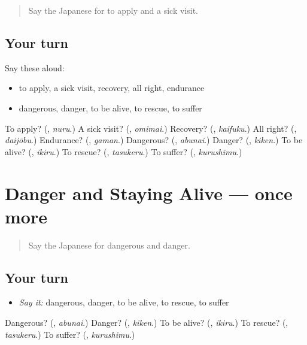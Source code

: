 \label{lesson:JA-R223-review-222-223}



\begin{quote}
Say the Japanese for to apply and a sick visit.
\end{quote}

\subsection*{Your turn}
Say these aloud:

\begin{itemize}
\raggedright
  \item to apply, a sick visit, recovery, all right, endurance
  \item dangerous, danger, to be alive, to rescue, to suffer
\end{itemize}

\begin{tcolorbox}[breakable,colback=teal!4,colframe=teal!35!black,title={Before you move on}]
To apply? (\textbf{}, \emph{nuru}.) A sick visit? (\textbf{}, \emph{omimai}.) Recovery? (\textbf{}, \emph{kaifuku}.) All right? (\textbf{}, \emph{daijōbu}.) Endurance? (\textbf{}, \emph{gaman}.) Dangerous? (\textbf{}, \emph{abunai}.) Danger? (\textbf{}, \emph{kiken}.) To be alive? (\textbf{}, \emph{ikiru}.) To rescue? (\textbf{}, \emph{tasukeru}.) To suffer? (\textbf{}, \emph{kurushimu}.)
\end{tcolorbox}
\section[(dialogue)]{Danger and Staying Alive — once more}

\label{lesson:JA-R223-review-final-223}



\begin{quote}
Say the Japanese for dangerous and danger.
\end{quote}

\subsection*{Your turn}
\begin{itemize}
\raggedright
  \item \emph{Say it:} dangerous, danger, to be alive, to rescue, to suffer
\end{itemize}

\begin{tcolorbox}[breakable,colback=teal!4,colframe=teal!35!black,title={Before you move on}]
Dangerous? (\textbf{}, \emph{abunai}.) Danger? (\textbf{}, \emph{kiken}.) To be alive? (\textbf{}, \emph{ikiru}.) To rescue? (\textbf{}, \emph{tasukeru}.) To suffer? (\textbf{}, \emph{kurushimu}.)
\end{tcolorbox}
